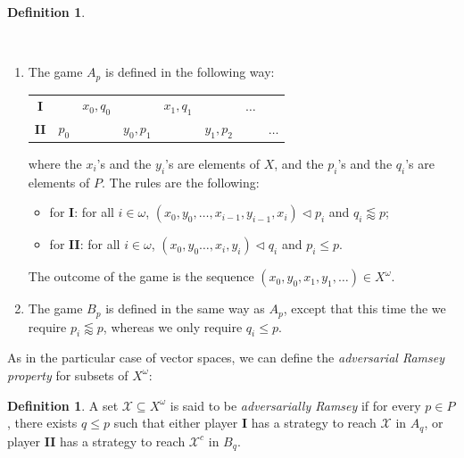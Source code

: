 \documentclass[a4paper,11pt]{article}
\makeatletter
\theoremstyle{definition}
\newtheorem{defin}[thm]{Definition}
\numberwithin{equation}{section}
\newcommand{\X}{\mathcal{X}}
\newcommand{\I}{\textbf{I}}
\newcommand{\II}{\textbf{II}}
\newcommand{\alaligne}{~\vspace*{\topsep}\nobreak\@afterheading}
\makeatother
\begin{document}
\begin{defin}\label{DefAdversarialGames}

\nopagebreak

\alaligne

\nopagebreak

\begin{enumerate}

\item The game $A_p$ is defined in the following way:

\smallskip

\begin{tabular}{cccccccc}
\textbf{I} & & $x_0,  q_0$ & & $x_1,  q_1$ & & $\hdots$ \\
\textbf{II} & $p_0$ & & $y_0,  p_1$ & & $y_1,  p_2 $ & & $\hdots$ 
\end{tabular}

\smallskip

\noindent where the $x_i$'s and the $y_i$'s are elements of $X$, and the $p_i$'s and the $q_i$'s are elements of $P$. The rules are the following:

\begin{itemize}

\item for \textbf{I}: for all $i \in \omega$, $(x_0, y_0, \ldots, x_{i - 1}, y_{i - 1}, x_i) \vartriangleleft p_i$ and $q_i \lessapprox p$;

\item for \textbf{II}: for all $i \in \omega$, $(x_0, y_0 \ldots, x_i, y_i) \vartriangleleft q_i$ and $p_i \leqslant p$.

\end{itemize}

\noindent The outcome of the game is the sequence $(x_0, y_0, x_1, y_1, \ldots) \in X^\omega$.

\item The game $B_p$ is defined in the same way as $A_p$, except that this time the we require $p_i \lessapprox p$, whereas we only require $q_i \leqslant p$.

\end{enumerate}

\end{defin}

As in the particular case of vector spaces, we can define the \emph{adversarial Ramsey property} for subsets of $X^\omega$:

\begin{defin}

A set $\X \subseteq X^\omega$ is said to be \emph{adversarially Ramsey} if for every $p \in P$, there exists $q \leqslant p$ such that either player \I{} has a strategy to reach $\X$ in $A_q$, or player \II{} has a strategy to reach $\X^c$ in $B_q$.

\end{defin}
\end{document}
